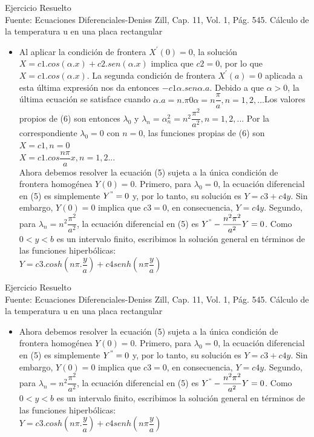\documentclass[10pt,a4paper]{beamer}
\begin{document}
\begin{frame}{Ejercicio Resuelto\\
}{Fuente: Ecuaciones Diferenciales-Deniss Zill, Cap. 11, Vol. 1, Pág. 545.
Cálculo de la temperatura u en una placa rectangular}


  \begin{itemize}
  \item
    Al aplicar la condición de frontera $X^{'}(0)=0$, la solución $X=c1.cos(\alpha.x)+c2.sen(\alpha.x)$
implica que $c2=0$, por lo que $X=c1.cos(\alpha.x)$. La segunda condición de frontera $X^{'}(a)=0$ aplicada a esta última expresión nos da entonces $-c1\alpha.sen\alpha.a$. Debido a que
$\alpha>0$, la última ecuación se satisface cuando $\alpha.a=n.\pi 0 \alpha=n\dfrac{\pi}{a}, n=1,2,...$Los
valores propios de (6) son entonces $\lambda_{0}$ y $\lambda_{n}=\alpha^{2}_{n}=n^{2}\dfrac{\pi^{2}}{a^{2}}, n=1,2,...$ Por la correspondiente
$\lambda_{0}=0$ con $n=0$, las funciones propias de (6) son\\
$X=c1, n=0$\\
$X=c1.cos\dfrac{n\pi}{a}x, n=1,2...$\\
Ahora debemos resolver la ecuación (5) sujeta a la única condición de frontera homogénea
$Y(0)=0$. Primero, para $\lambda_{0}=0$, la ecuación diferencial en (5) es simplemente
$Y^{"}=0$ y, por lo tanto, su solución es $Y=c3+c4y$. Sin embargo, $Y(0)=0$ implica que $c3=0$, en consecuencia, $Y=c4y$. Segundo, para $\lambda_{n}=n^{2}\dfrac{\pi^{2}}{a^{2}}$, la ecuación diferencial en (5) es $Y^{"}-\dfrac{n^{2}\pi^{2}}{a^{2}}Y=0$. Como $0 < y < b$ es un intervalo finito, escribimos la solución general en términos de las funciones hiperbólicas:\\
$Y=c3.cosh(n\pi.\dfrac{y}{a})+c4senh(n\pi\dfrac{y}{a})$\\
    
  \end{itemize}
\end{frame}



\begin{frame}{Ejercicio Resuelto\\
}{Fuente: Ecuaciones Diferenciales-Deniss Zill, Cap. 11, Vol. 1, Pág. 545.
Cálculo de la temperatura u en una placa rectangular}


  \begin{itemize}
  \item
   Ahora debemos resolver la ecuación (5) sujeta a la única condición de frontera homogénea
$Y(0)=0$. Primero, para $\lambda_{0}=0$, la ecuación diferencial en (5) es simplemente
$Y^{"}=0$ y, por lo tanto, su solución es $Y=c3+c4y$. Sin embargo, $Y(0)=0$ implica que $c3=0$, en consecuencia, $Y=c4y$. Segundo, para $\lambda_{n}=n^{2}\dfrac{\pi^{2}}{a^{2}}$, la ecuación diferencial en (5) es $Y^{"}-\dfrac{n^{2}\pi^{2}}{a^{2}}Y=0$. Como $0 < y < b$ es un intervalo finito, escribimos la solución general en términos de las funciones hiperbólicas:\\
$Y=c3.cosh(n\pi.\dfrac{y}{a})+c4senh(n\pi\dfrac{y}{a})$\\
    
  \end{itemize}
\end{frame}
\end{document}
